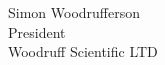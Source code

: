 \documentclass[english]{article}
\begin{document}



Simon Woodrufferson \\

President \\

Woodruff Scientific LTD
\newpage
\tableofcontents
\newpage 
%

\newpage 
\end{document}
